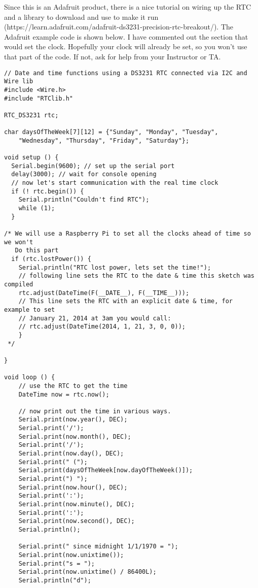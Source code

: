 Since this is an Adafruit product, there is a nice tutorial on wiring up the RTC and a library to download and use to make it run (https://learn.adafruit.com/adafruit-ds3231-precision-rtc-breakout/). The Adafruit example code is shown below. I have commented out the section that would set the clock. Hopefully your clock will already be set, so you won't use that part of the code. If not, ask for help from your Instructor or TA.

\bigskip
\begin{verbatim}
// Date and time functions using a DS3231 RTC connected via I2C and Wire lib
#include <Wire.h>
#include "RTClib.h"
 
RTC_DS3231 rtc;
 
char daysOfTheWeek[7][12] = {"Sunday", "Monday", "Tuesday", 
    "Wednesday", "Thursday", "Friday", "Saturday"};
 
void setup () {
  Serial.begin(9600); // set up the serial port
  delay(3000); // wait for console opening
  // now let's start communication with the real time clock
  if (! rtc.begin()) {
    Serial.println("Couldn't find RTC");
    while (1);
  }
 
/* We will use a Raspberry Pi to set all the clocks ahead of time so we won't
   Do this part
  if (rtc.lostPower()) {
    Serial.println("RTC lost power, lets set the time!");
    // following line sets the RTC to the date & time this sketch was compiled
    rtc.adjust(DateTime(F(__DATE__), F(__TIME__)));
    // This line sets the RTC with an explicit date & time, for example to set
    // January 21, 2014 at 3am you would call:
    // rtc.adjust(DateTime(2014, 1, 21, 3, 0, 0));
    }
 */ 
  
}
 
void loop () {
    // use the RTC to get the time
    DateTime now = rtc.now();
    
    // now print out the time in various ways.
    Serial.print(now.year(), DEC);
    Serial.print('/');
    Serial.print(now.month(), DEC);
    Serial.print('/');
    Serial.print(now.day(), DEC);
    Serial.print(" (");
    Serial.print(daysOfTheWeek[now.dayOfTheWeek()]);
    Serial.print(") ");
    Serial.print(now.hour(), DEC);
    Serial.print(':');
    Serial.print(now.minute(), DEC);
    Serial.print(':');
    Serial.print(now.second(), DEC);
    Serial.println();
    
    Serial.print(" since midnight 1/1/1970 = ");
    Serial.print(now.unixtime());
    Serial.print("s = ");
    Serial.print(now.unixtime() / 86400L);
    Serial.println("d");
    

\end{verbatim}
